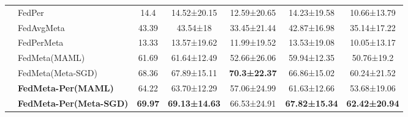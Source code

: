 \documentclass[oneside,a4paper,14pt]{extreport}
\begin{document}
\begin{table}[H]
{\begin{tabular}{c|l|ccccc}
    \multicolumn{1}{l|}{}                            & FedPer                                  & 14.4           & 14.52±20.15          & 12.59±20.65            & 14.23±19.58          & 10.66±13.79           \\
    \multicolumn{1}{l|}{}                            & FedAvgMeta                              & 43.39          & 43.54±18             & 33.45±21.44            & 42.87±16.98          & 35.14±17.22           \\
    \multicolumn{1}{l|}{}                            & FedPerMeta                              & 13.33          & 13.57±19.62          & 11.99±19.52            & 13.53±19.08          & 10.05±13.17           \\
    \multicolumn{1}{l|}{}                            & FedMeta(MAML)                           & 61.69          & 61.64±12.49          & 52.66±26.06            & 59.94±12.35          & 50.76±19.2            \\
    \multicolumn{1}{l|}{}                            & FedMeta(Meta-SGD)                       & 68.36          & 67.89±15.11          & \textbf{70.3±22.37}    & 66.86±15.02          & 60.24±21.52           \\
    \multicolumn{1}{l|}{}                            & \textbf{\textbf{FedMeta-Per(MAML)}}     & 64.22          & 63.70±12.29          & 57.06±24.99            & 61.63±12.66          & 53.68±19.06           \\
    \multicolumn{1}{l|}{}                            & \textbf{\textbf{FedMeta-Per(Meta-SGD)}} & \textbf{69.97} & \textbf{69.13±14.63} & 66.53±24.91            & \textbf{67.82±15.34} & \textbf{62.42±20.94}  \\
    \bottomrule
    \end{tabular}
    }
\end{table}
\end{document}
